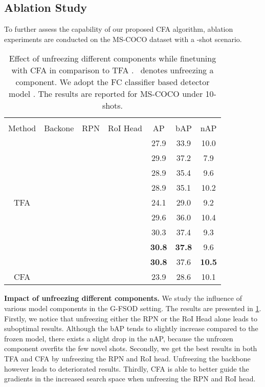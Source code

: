 \documentclass[10pt,twocolumn,letterpaper]{article}
\newcommand{\cmark}{\ding{51}}\newcommand{\xmark}{\ding{55}}\newcommand\minisection[1]{\vspace{1mm}\noindent \textbf{#1}}
\begin{document}
\subsection{Ablation Study}
To further assess the capability of our proposed CFA algorithm, ablation experiments are conducted on the MS-COCO dataset with a -shot scenario.
\begin{table}[t!] \centering
	\setlength{\tabcolsep}{2.5mm}
	\scalebox{0.8}
	{\begin{tabular}{c|ccc|ccc}
\toprule[1.1pt]
			\multicolumn{1}{c|}{}            & \multicolumn{3}{c|}{}                  &\multicolumn{3}{c}{} \\
			\multicolumn{1}{c|}{\multirow{-2}{*}{Method}}      &\multicolumn{1}{c}{\multirow{-2}{*}{Backone}} & \multicolumn{1}{c}{\multirow{-2}{*}{RPN}}        & \multicolumn{1}{c|}{\multirow{-2}{*}{RoI Head}}                       & \multicolumn{1}{c}{\multirow{-2}{*}{AP}}            & \multicolumn{1}{c}{\multirow{-2}{*}{bAP}}  &  \multicolumn{1}{c}{\multirow{-2}{*}{nAP}}                 \\
			\midrule[0.9pt]
			  &&&& 27.9 & 33.9 & 10.0 \\
			  & &\cmark&&29.9&37.2& 7.9\\
			  &  &&\cmark&28.9&35.4&9.6 \\
			  &&\cmark&\cmark&28.9&35.1&10.2 \\
			\multirow{-5}{*}{TFA}  &\cmark &\cmark&\cmark&24.1&29.0&9.2 \\
			\midrule[0.9pt]
			  & &&&29.6&36.0&10.4\\
			  & &\cmark&&30.3&37.4&9.3 \\
			  &  &&\cmark&\textbf{30.8}&\textbf{37.8}&9.6 \\
			  & &\cmark&\cmark&\textbf{30.8} & 37.6 & \textbf{10.5} \\
			\multirow{-5}{*}{CFA}  &\cmark &\cmark&\cmark&23.9&28.6&10.1 \\
			
			
			\bottomrule[1.1pt]
	\end{tabular}}
\caption{Effect of unfreezing different components while finetuning with CFA in comparison to TFA \cite{TFA}. \cmark\ denotes unfreezing a component. We adopt the FC classifier based detector model \cite{FasterR-CNN}. The results are reported for MS-COCO under 10-shots.}
	\vspace{-1em}
	\label{tab:ablation-study}
\end{table} 

\textbf{Impact of unfreezing different components.} We study the influence of various model components in the G-FSOD setting. The results are presented in \cref{tab:ablation-study}.
Firstly, we notice that unfreezing either the RPN or the RoI Head alone leads to suboptimal results. Although the bAP tends to slightly increase compared to the frozen model, there exists a slight drop in the nAP, because the unfrozen component overfits the few novel shots. Secondly, we get the best results in both TFA and CFA by unfreezing the RPN and RoI head. Unfreezing the backbone however leads to deteriorated results. Thirdly, CFA is able to better guide the gradients in the increased search space when unfreezing the RPN and RoI head.  
\end{document}
